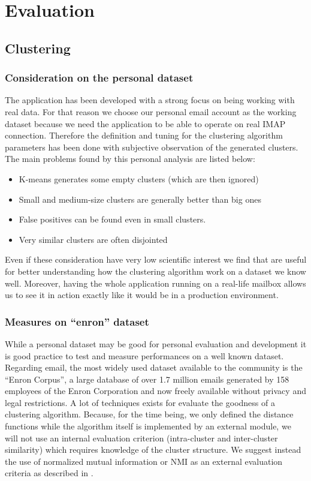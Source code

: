 \documentclass[a4paper,12pt]{report}
\begin{document}
\chapter{Evaluation}
\section{Clustering}
\subsection{Consideration on the personal dataset} %
\label{sub:consideration_on_the_personal_dataset}
The application has been developed with a strong focus on being working with real data. For that reason we choose our personal email account as the working dataset because we need the application to be able to operate on real IMAP connection. Therefore the definition and tuning for the clustering algorithm parameters has been done with subjective observation of the generated clusters.
The main problems found by this personal analysis are listed below: 
\begin{itemize}
  \item K-means generates some empty clusters (which are then ignored)
  \item Small and medium-size clusters are generally better than big ones
  \item False positives can be found even in small clusters.
  \item Very similar clusters are often disjointed 
\end{itemize}

Even if these consideration have very low scientific interest we find that are useful for better understanding how the clustering algorithm work on a dataset we know well. Moreover, having the whole application running on a real-life mailbox allows us to see it in action exactly like it would be in a production environment.


\subsection{Measures on ``enron'' dataset} %
\label{sub:measures_on_enron}
While a personal dataset may be good for personal evaluation and development it is good practice to test and measure performances on a well known dataset. Regarding email, the most widely used dataset available to the community is the ``Enron Corpus'', a large database of over 1.7 million emails generated by 158 employees of the Enron Corporation and now freely available without privacy and legal restrictions.
A lot of techniques exists for evaluate the goodness of a clustering algorithm. Because, for the time being, we only defined the distance functions while the algorithm itself is implemented by an external module, we will not use an internal evaluation criterion (intra-cluster and inter-cluster similarity) which requires knowledge of the cluster structure.
We suggest instead the use of normalized mutual information or NMI as an external evaluation criteria as described in \cite{Manning2008}.
\end{document}
